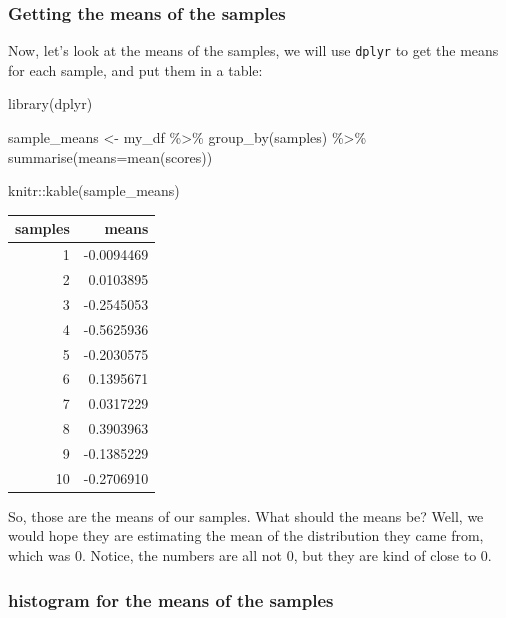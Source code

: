 \documentclass[
]{book}
\newenvironment{Shaded}{\begin{snugshade}}{\end{snugshade}}
\newcommand{\AttributeTok}[1]{\textcolor[rgb]{0.77,0.63,0.00}{#1}}
\newcommand{\FunctionTok}[1]{\textcolor[rgb]{0.00,0.00,0.00}{#1}}
\newcommand{\NormalTok}[1]{#1}
\newcommand{\OtherTok}[1]{\textcolor[rgb]{0.56,0.35,0.01}{#1}}
\newcommand{\SpecialCharTok}[1]{\textcolor[rgb]{0.00,0.00,0.00}{#1}}
\begin{document}
\hypertarget{getting-the-means-of-the-samples}{%
\subsubsection{Getting the means of the samples}\label{getting-the-means-of-the-samples}}

Now, let's look at the means of the samples, we will use \texttt{dplyr} to get the means for each sample, and put them in a table:

\begin{Shaded}
\begin{Highlighting}[]
\FunctionTok{library}\NormalTok{(dplyr)}

\NormalTok{sample\_means }\OtherTok{\textless{}{-}}\NormalTok{ my\_df }\SpecialCharTok{\%\textgreater{}\%}
                \FunctionTok{group\_by}\NormalTok{(samples) }\SpecialCharTok{\%\textgreater{}\%}
                \FunctionTok{summarise}\NormalTok{(}\AttributeTok{means=}\FunctionTok{mean}\NormalTok{(scores))}

\NormalTok{knitr}\SpecialCharTok{::}\FunctionTok{kable}\NormalTok{(sample\_means)}
\end{Highlighting}
\end{Shaded}

\begin{tabular}{r|r}
\hline
samples & means\\
\hline
1 & -0.0094469\\
\hline
2 & 0.0103895\\
\hline
3 & -0.2545053\\
\hline
4 & -0.5625936\\
\hline
5 & -0.2030575\\
\hline
6 & 0.1395671\\
\hline
7 & 0.0317229\\
\hline
8 & 0.3903963\\
\hline
9 & -0.1385229\\
\hline
10 & -0.2706910\\
\hline
\end{tabular}

So, those are the means of our samples. What should the means be? Well, we would hope they are estimating the mean of the distribution they came from, which was 0. Notice, the numbers are all not 0, but they are kind of close to 0.

\hypertarget{histogram-for-the-means-of-the-samples}{%
\subsubsection{histogram for the means of the samples}\label{histogram-for-the-means-of-the-samples}}
\end{document}
